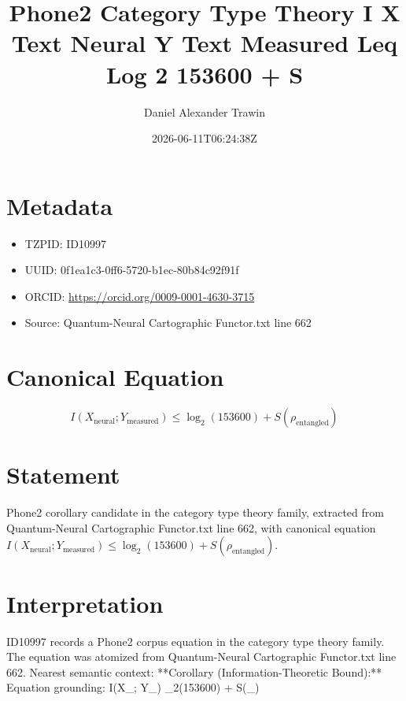 \documentclass[11pt]{article}
\title{Phone2 Category Type Theory I X Text Neural Y Text Measured Leq Log 2 153600 + S}
\author{Daniel Alexander Trawin}
\date{2026-06-11T06:24:38Z}
\begin{document}
\maketitle
\section*{Metadata}
\begin{itemize}
\item TZPID: ID10997
\item UUID: 0f1ea1c3-0ff6-5720-b1ec-80b84c92f91f
\item ORCID: \url{https://orcid.org/0009-0001-4630-3715}
\item Source: Quantum-Neural Cartographic Functor.txt line 662
\end{itemize}
\section*{Canonical Equation}
\[
I(X_{\text{neural}}; Y_{\text{measured}}) \leq \log_2(153600) + S(\rho_{\text{entangled}})
\]
\section*{Statement}
Phone2 corollary candidate in the category type theory family, extracted from Quantum-Neural Cartographic Functor.txt line 662, with canonical equation $I(X_{\text{neural}}; Y_{\text{measured}}) \leq \log_2(153600) + S(\rho_{\text{entangled}})$.
\section*{Interpretation}
ID10997 records a Phone2 corpus equation in the category type theory family. The equation was atomized from Quantum-Neural Cartographic Functor.txt line 662. Nearest semantic context: **Corollary (Information-Theoretic Bound):** Equation grounding: I(X_{}; Y_{}) \leq \log_2(153600) + S(\rho_{})
\end{document}

